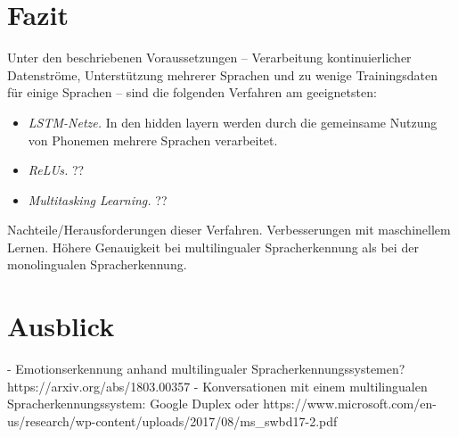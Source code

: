 \section{Fazit}
Unter den beschriebenen Voraussetzungen – Verarbeitung kontinuierlicher Datenströme, Unterstützung mehrerer Sprachen und
zu wenige Trainingsdaten für einige Sprachen – sind die folgenden Verfahren am geeignetsten:

\begin{itemize}
  \item \textit{LSTM-Netze.} In den hidden layern werden durch die gemeinsame Nutzung von Phonemen mehrere Sprachen verarbeitet.
  \item \textit{ReLUs.} ??
  \item \textit{Multitasking Learning.} ??
\end{itemize}

Nachteile/Herausforderungen dieser Verfahren.
Verbesserungen mit maschinellem Lernen.
Höhere Genauigkeit bei multilingualer Spracherkennung als bei der monolingualen Spracherkennung.

\section{Ausblick}
- Emotionserkennung anhand multilingualer Spracherkennungssystemen? https://arxiv.org/abs/1803.00357
- Konversationen mit einem multilingualen Spracherkennungssystem: Google Duplex oder https://www.microsoft.com/en-us/research/wp-content/uploads/2017/08/ms_swbd17-2.pdf

\ifCLASSOPTIONcaptionsoff
  \newpage
\fi